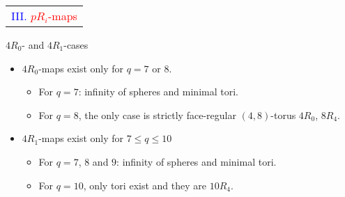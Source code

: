 \documentclass[%
pdf,
colorBG,
slideColor,
]{prosper}
\begin{document}
%


\begin{slide}{}
\begin{center}
{\Huge 
\begin{tabular*}{7cm}{c}
\\[-0.5cm]
\textcolor{blue}{III. }\textcolor{red}{$pR_i$-maps}
\end{tabular*}
}
\end{center}
\end{slide}


\begin{slide}{$4R_0$- and $4R_1$-cases}
\vspace{-3mm}
\begin{itemize}
\item $4R_0$-maps exist only for $q=7$ or $8$.
\begin{itemize}
\item For $q=7$: infinity of spheres and minimal tori.
\item For $q=8$, the only case is strictly face-regular $(4,8)$-torus 
$4R_0$, $8R_4$.
\end{itemize}
\item $4R_1$-maps exist only for $7\leq q\leq 10$
\begin{itemize}
\item For $q=7$, $8$ and $9$: infinity of spheres and minimal tori.
\begin{center}
\begin{minipage}{5.0cm}
\centering
{}\par
\end{minipage}
\end{center}
\item For $q=10$, only tori exist and they are $10R_4$.
\end{itemize}

\end{itemize}

\end{slide}
\end{document}
